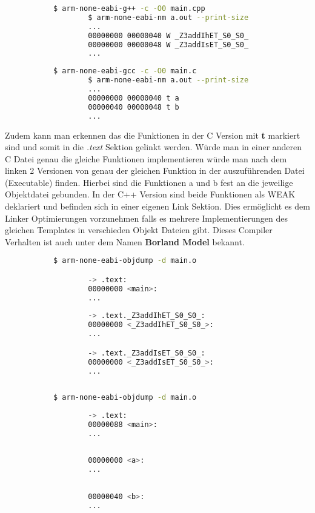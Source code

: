 \documentclass[MES,Master,ngerman]{twbook}%
\begin{document}
\begin{figure}[!htb]
	\begin{subfigure}[b]{0.5\textwidth}
		\begin{lstlisting}[gobble=6, title={Analyse C++}, language=bash, numbers=none]
		$ arm-none-eabi-g++ -c -O0 main.cpp
		$ arm-none-eabi-nm a.out --print-size
		...
		00000000 00000040 W _Z3addIhET_S0_S0_
		00000000 00000048 W _Z3addIsET_S0_S0_
		...
		\end{lstlisting}
	\end{subfigure}
	\begin{subfigure}[b]{0.5\textwidth}
		\begin{lstlisting}[gobble=6, title={Analyse C}, language=bash, numbers=none]
		$ arm-none-eabi-gcc -c -O0 main.c
		$ arm-none-eabi-nm a.out --print-size
		...
		00000000 00000040 t a
		00000040 00000048 t b
		...
		\end{lstlisting}
	\end{subfigure}
\end{figure}

Zudem kann man erkennen das die Funktionen in der C Version mit \textbf{t} markiert sind und somit in die \textit{.text} Sektion gelinkt werden. Würde man in einer anderen C Datei genau die gleiche Funktionen implementieren würde man nach dem linken 2 Versionen von genau der gleichen Funktion in der auszuführenden Datei (Executable) finden. Hierbei sind die Funktionen a und b fest an die jeweilige Objektdatei gebunden. In der C++ Version sind beide Funktionen als WEAK deklariert und befinden sich in einer eigenen Link Sektion. Dies ermöglicht es dem Linker Optimierungen vorzunehmen falls es mehrere Implementierungen des gleichen Templates in verschieden Objekt Dateien gibt. Dieses Compiler Verhalten ist auch unter dem Namen \textbf{Borland Model} bekannt.

\begin{figure}[!htb]
	\begin{subfigure}[b]{0.5\textwidth}
		\begin{lstlisting}[gobble=6, title={Analyse C++}, language=bash, numbers=none]
		$ arm-none-eabi-objdump -d main.o

		-> .text:
		00000000 <main>:
		...
		
		-> .text._Z3addIhET_S0_S0_:
		00000000 <_Z3addIhET_S0_S0_>:
		...

		-> .text._Z3addIsET_S0_S0_:
		00000000 <_Z3addIsET_S0_S0_>:
		...
		
		\end{lstlisting}
	\end{subfigure}
	\begin{subfigure}[b]{0.5\textwidth}
		\begin{lstlisting}[gobble=6, title={Analyse C}, language=bash, numbers=none]
		$ arm-none-eabi-objdump -d main.o
		
		-> .text:
		00000088 <main>:
		...
		
		
		00000000 <a>:
		...
		
		
		00000040 <b>:
		...
		\end{lstlisting}
	\end{subfigure}
\end{figure}
\end{document}

